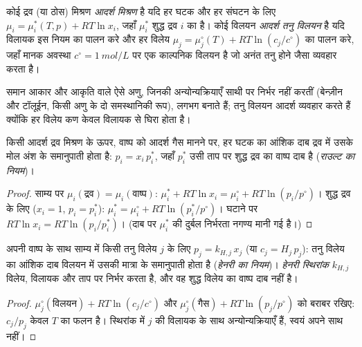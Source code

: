 \begin{definition}\label{def:b2:chemical-potential:ideal-mixture}
कोई द्रव (या ठोस) मिश्रण \emph{आदर्श मिश्रण} है
यदि हर घटक और हर संघटन के लिए
$\mu_i = \mu_i^*(T, p) + RT\ln x_i$, जहाँ $\mu_i^*$ शुद्ध द्रव $i$ का  है। कोई विलयन \emph{आदर्श तनु
विलयन} है यदि विलायक इस नियम का पालन करे और हर
विलेय $\mu_j = \mu_j^\circ(T) + RT\ln(c_j/c^\circ)$ का पालन करे, जहाँ मानक
अवस्था $c^\circ = \qty{1}{mol/L}$ पर एक काल्पनिक विलयन है जो अनंत तनु
होने जैसा व्यवहार करता है।
\end{definition}

समान आकार और आकृति वाले ऐसे अणु, जिनकी अन्योन्यक्रियाएँ साथी पर निर्भर नहीं करतीं
(बेन्ज़ीन और टॉलूईन, किसी अणु के दो समस्थानिकी रूप), लगभग
 बनाते हैं; तनु विलयन आदर्श व्यवहार करते हैं क्योंकि हर विलेय
कण केवल विलायक से घिरा होता है।

\begin{theorem}[राउल्ट का नियम]\label{thm:b2:chemical-potential:raoult}
किसी आदर्श द्रव मिश्रण के ऊपर, वाष्प को आदर्श गैस मानने पर, हर घटक का आंशिक
दाब द्रव में उसके मोल अंश के समानुपाती होता है:
$p_i = x_i\,p_i^*$, जहाँ $p_i^*$ उसी ताप पर शुद्ध द्रव का वाष्प दाब
है (\emph{राउल्ट का नियम})।
\end{theorem}

\begin{proof}
साम्य पर $\mu_i(\text{द्रव}) = \mu_i(\text{वाष्प})$: $\mu_i^* +
RT\ln x_i = \mu_i^\circ + RT\ln(p_i/p^\circ)$। शुद्ध द्रव के लिए ($x_i = 1$,
$p_i = p_i^*$): $\mu_i^* = \mu_i^\circ + RT\ln(p_i^*/p^\circ)$। घटाने पर
$RT\ln x_i = RT\ln(p_i/p_i^*)$। (दाब पर $\mu_i^*$ की दुर्बल निर्भरता
नगण्य मानी गई है।)
\end{proof}

\begin{proposition}[हेनरी का नियम]\label{prop:b2:chemical-potential:henry}
अपनी वाष्प के साथ साम्य में किसी तनु विलेय $j$ के लिए $p_j = k_{H,j}\,x_j$
(या $c_j = H_j\,p_j$): तनु विलेय का आंशिक दाब विलयन में उसकी मात्रा के
समानुपाती होता है (\emph{हेनरी का
नियम})। \emph{हेनरी स्थिरांक}
$k_{H,j}$ विलेय, विलायक और ताप पर निर्भर करता है, और वह
शुद्ध विलेय का वाष्प दाब नहीं है।
\end{proposition}

\begin{proof}
$\mu_j^\circ(\text{विलयन}) + RT\ln(c_j/c^\circ)$ और
$\mu_j^\circ(\text{गैस}) + RT\ln(p_j/p^\circ)$ को बराबर रखिए: $c_j/p_j$ केवल
$T$ का फलन है। स्थिरांक में $j$ की विलायक के साथ अन्योन्यक्रियाएँ हैं,
स्वयं अपने साथ नहीं।
\end{proof}

